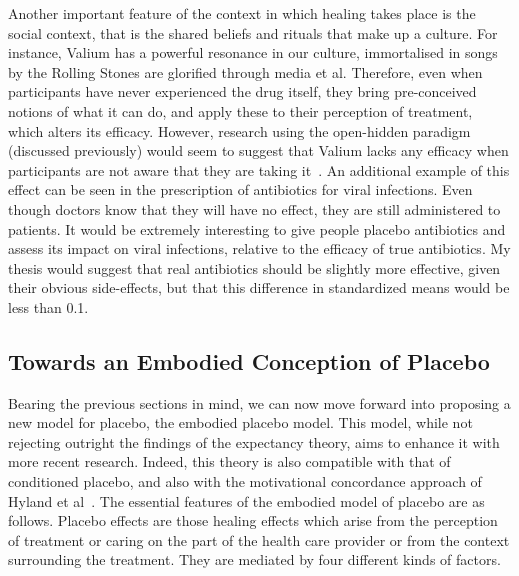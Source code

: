 Another important feature of the context in which healing takes place is the social context, that is the shared beliefs and rituals that make up a culture. For instance, Valium has a powerful resonance in our culture, immortalised in songs by the Rolling Stones are glorified through media et al. Therefore, even when participants have never experienced the drug itself, they bring pre-conceived notions of what it can do, and apply these to their perception of treatment, which alters its efficacy. However, research using the open-hidden paradigm (discussed previously) would seem to suggest that Valium lacks any efficacy when participants are not aware that they are taking it~\cite{benedetti2003}. An additional example of this effect can be seen in the prescription of antibiotics for viral infections. Even though doctors know that they will have no effect, they are still administered to patients. It would be extremely interesting to give people placebo antibiotics and assess its impact on viral infections, relative to the efficacy of true antibiotics. My thesis would suggest that real antibiotics should be slightly more effective, given their obvious side-effects, but that this difference in standardized means would be less than 0.1. 


\subsection{Towards an Embodied Conception of Placebo}

Bearing the previous sections in mind, we can now move forward into proposing a new model for placebo, the embodied placebo model. This model, while not rejecting outright the findings of the expectancy theory, aims to enhance it with more recent research. Indeed, this theory is also compatible with that of conditioned placebo, and also with the motivational concordance approach of Hyland et al~\cite{Hyland2007}.  
The essential features of the embodied model of placebo are as follows. Placebo effects are those healing effects which arise from the perception of treatment or caring on the part of the health care provider or from the context surrounding the treatment. They are mediated by four different kinds of factors.


